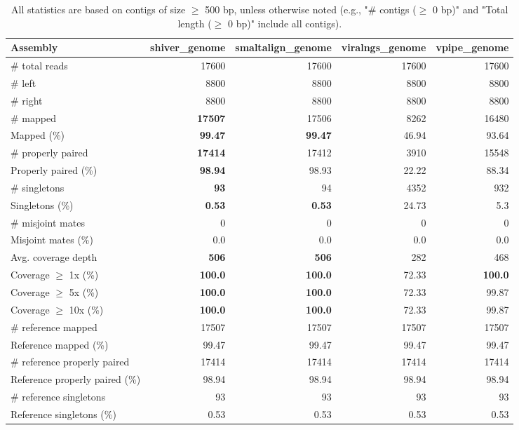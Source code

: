\documentclass[12pt,a4paper]{article}
\begin{document}
\begin{table}[ht]
\begin{center}
\caption{All statistics are based on contigs of size $\geq$ 500 bp, unless otherwise noted (e.g., "\# contigs ($\geq$ 0 bp)" and "Total length ($\geq$ 0 bp)" include all contigs).}
\begin{tabular}{|l*{4}{|r}|}
\hline
Assembly & shiver\_genome & smaltalign\_genome & viralngs\_genome & vpipe\_genome \\ \hline
\# total reads & 17600 & 17600 & 17600 & 17600 \\ \hline
\# left & 8800 & 8800 & 8800 & 8800 \\ \hline
\# right & 8800 & 8800 & 8800 & 8800 \\ \hline
\# mapped & {\bf 17507} & 17506 & 8262 & 16480 \\ \hline
Mapped (\%) & {\bf 99.47} & {\bf 99.47} & 46.94 & 93.64 \\ \hline
\# properly paired & {\bf 17414} & 17412 & 3910 & 15548 \\ \hline
Properly paired (\%) & {\bf 98.94} & 98.93 & 22.22 & 88.34 \\ \hline
\# singletons & {\bf 93} & 94 & 4352 & 932 \\ \hline
Singletons (\%) & {\bf 0.53} & {\bf 0.53} & 24.73 & 5.3 \\ \hline
\# misjoint mates & 0 & 0 & 0 & 0 \\ \hline
Misjoint mates (\%) & 0.0 & 0.0 & 0.0 & 0.0 \\ \hline
Avg. coverage depth & {\bf 506} & {\bf 506} & 282 & 468 \\ \hline
Coverage $\geq$ 1x (\%) & {\bf 100.0} & {\bf 100.0} & 72.33 & {\bf 100.0} \\ \hline
Coverage $\geq$ 5x (\%) & {\bf 100.0} & {\bf 100.0} & 72.33 & 99.87 \\ \hline
Coverage $\geq$ 10x (\%) & {\bf 100.0} & {\bf 100.0} & 72.33 & 99.87 \\ \hline
\# reference mapped & 17507 & 17507 & 17507 & 17507 \\ \hline
Reference mapped (\%) & 99.47 & 99.47 & 99.47 & 99.47 \\ \hline
\# reference properly paired & 17414 & 17414 & 17414 & 17414 \\ \hline
Reference properly paired (\%) & 98.94 & 98.94 & 98.94 & 98.94 \\ \hline
\# reference singletons & 93 & 93 & 93 & 93 \\ \hline
Reference singletons (\%) & 0.53 & 0.53 & 0.53 & 0.53 \\ \hline

\end{tabular}
\end{center}
\end{table}
\end{document}
